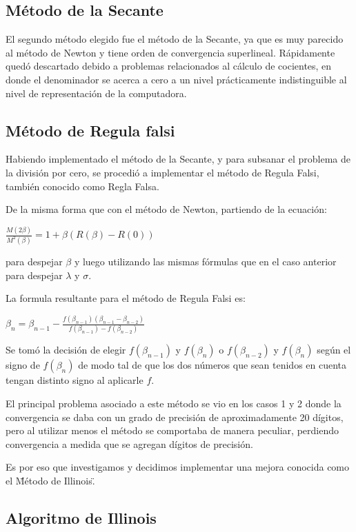 \subsection{M\'etodo de la Secante}

El segundo m\'etodo elegido fue el m\'etodo de la Secante, ya que es muy parecido al m\'etodo de Newton y tiene orden de convergencia superlineal. R\'apidamente qued\'o descartado debido a problemas relacionados al c\'alculo de cocientes, en donde el denominador se acerca a cero a un nivel pr\'acticamente indistinguible al nivel de representaci\'on de la computadora.

\subsection{M\'etodo de Regula falsi}

Habiendo implementado el m\'etodo de la Secante, y para subsanar el problema de la divisi\'on por cero, se procedi\'o a implementar el m\'etodo de Regula Falsi, tambi\'en conocido como Regla Falsa.

De la misma forma que con el m\'etodo de Newton, partiendo de la ecuaci\'on:

$\frac{M(2\beta)}{M^2(\beta)}=1 + \beta(R(\beta)-R(0))$

para despejar $\beta$ y luego utilizando las mismas f\'ormulas que en el caso anterior para despejar $\lambda$ y $\sigma$.

La formula resultante para el m\'etodo de Regula Falsi es:

$\beta_n = \beta_{n-1} - \frac{f(\beta_{n-1}) (\beta_{n-1}-\beta_{n-2})}{f(\beta_{n-1}) - f(\beta_{n-2})}$

Se tom\'o la decisi\'on de elegir $f(\beta_{n-1})$ y $f(\beta_n)$ o $f(\beta_{n-2})$ y $f(\beta_n)$ seg\'un el signo de $f(\beta_n)$ de modo tal de que los dos n\'umeros que sean tenidos en cuenta tengan distinto signo al aplicarle $f$.

El principal problema asociado a este m\'etodo se vio en los casos 1 y 2 donde
la convergencia se daba con un grado de precisi\'on de aproximadamente 20
d\'igitos, pero al utilizar menos el m\'etodo se comportaba de manera peculiar,
perdiendo convergencia a medida que se agregan d\'igitos de precisi\'on.

Es por eso que investigamos y decidimos implementar una mejora conocida como el
\"M\'etodo de Illinois\".

\subsection{Algoritmo de Illinois}

